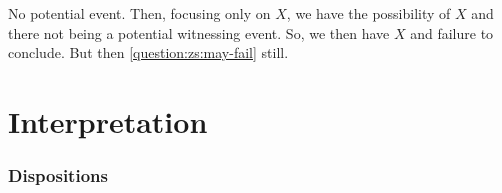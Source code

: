 \begin{note}
  No potential event.
  Then, focusing only on \(X\), we have the possibility of \(X\) and there not being a potential witnessing event.
  So, we then have \(X\) and failure to conclude.
  But then \ref{question:zs:may-fail} still.
\end{note}

\section{Interpretation}
\label{cha:zSpA:sec:interpretation}

\subsubsection{Dispositions}
\label{sec:dispositions}

